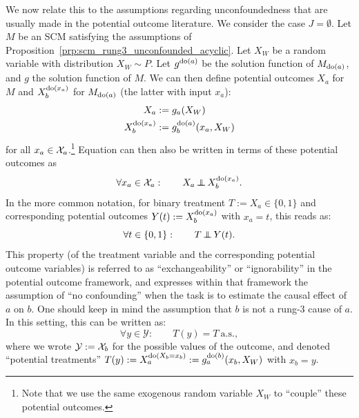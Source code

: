 We now relate this to the assumptions regarding unconfoundedness that are usually made in the potential outcome literature.
We consider the case $J = \emptyset$. Let $M$ be an SCM satisfying the assumptions of Proposition~\ref{prp:scm_rung3_unconfounded_acyclic}.
Let $X_W$ be a random variable with distribution $X_W \sim P$. 
Let $g^{\operatorname{do}(a)}$ be the solution function of $M_{\operatorname{do}(a)}$, and $g$ the solution function of $M$.
We can then define potential outcomes $X_a$ for $M$ and $X_{b}^{\operatorname{do}(x_{a})}$ for $M_{\operatorname{do}(a)}$ (the latter with input $x_{a}$):
\begin{align*}
  X_a &:= g_a(X_W) \\
  X_{b}^{\operatorname{do}(x_a)} &:= g^{\operatorname{do}(a)}_b(x_a,X_W)
\end{align*}
for all $x_a \in \mathcal{X}_a$.\footnote{Note that we use the same exogenous random variable $X_W$ to ``couple'' these potential outcomes.}
Equation  can then also be written in terms of these potential outcomes as
  $$\forall x_a \in \mathcal{X}_a : \qquad X_a \operatorname*{\perp\mkern-11mu\perp} X_b^{\operatorname{do}(x_a)}.$$
In the more common notation, for binary treatment $T := X_a \in \{0,1\}$ and corresponding potential outcomes $Y(t) := X_{b}^{\operatorname{do}(x_a)}$ with $x_a=t$, this reads as:
  $$\forall t \in \{0,1\} : \qquad T \operatorname*{\perp\mkern-11mu\perp} Y(t).$$
This property (of the treatment variable and the corresponding potential outcome variables) is referred to as ``exchangeability'' or ``ignorability'' in the potential outcome framework, 
and expresses within that framework the assumption of ``no confounding'' when the task is to estimate the causal effect of $a$ on $b$.
One should keep in mind the assumption that $b$ is not a rung-3 cause of $a$. 
In this setting, this can be written as:
$$\forall y \in \mathcal{Y}: \qquad T(y) = T\ \mathrm{a.s.},$$
where we wrote $\mathcal{Y} := \mathcal{X}_b$ for the possible values of the outcome, and denoted ``potential treatments'' $T(y) := X_a^{\operatorname{do}(X_b=x_b)} := g^{\operatorname{do}(b)}_a(x_b,X_W)$ with $x_b=y$.

 



